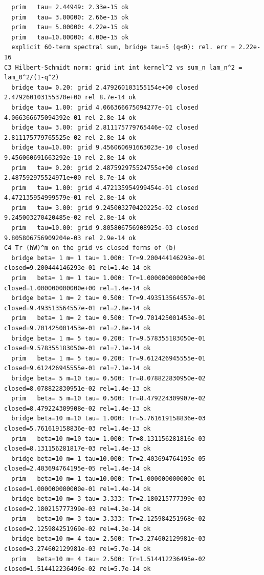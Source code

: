 \documentclass[11pt,a4paper]{article}
\begin{document}
\begin{lstlisting}
  prim   tau= 2.44949: 2.33e-15 ok
  prim   tau= 3.00000: 2.66e-15 ok
  prim   tau= 5.00000: 4.22e-15 ok
  prim   tau=10.00000: 4.00e-15 ok
  explicit 60-term spectral sum, bridge tau=5 (q<0): rel. err = 2.22e-16
C3 Hilbert-Schmidt norm: grid int int kernel^2 vs sum_n lam_n^2 = lam_0^2/(1-q^2)
  bridge tau= 0.20: grid 2.479260103155154e+00 closed 2.479260103155370e+00 rel 8.7e-14 ok
  bridge tau= 1.00: grid 4.066366675094277e-01 closed 4.066366675094392e-01 rel 2.8e-14 ok
  bridge tau= 3.00: grid 2.811175779765446e-02 closed 2.811175779765525e-02 rel 2.8e-14 ok
  bridge tau=10.00: grid 9.456060691663023e-10 closed 9.456060691663292e-10 rel 2.8e-14 ok
  prim   tau= 0.20: grid 2.487592975524755e+00 closed 2.487592975524971e+00 rel 8.7e-14 ok
  prim   tau= 1.00: grid 4.472135954999454e-01 closed 4.472135954999579e-01 rel 2.8e-14 ok
  prim   tau= 3.00: grid 9.245003270420225e-02 closed 9.245003270420485e-02 rel 2.8e-14 ok
  prim   tau=10.00: grid 9.805806756908925e-03 closed 9.805806756909204e-03 rel 2.9e-14 ok
C4 Tr (hW)^m on the grid vs closed forms of (b)
  bridge beta= 1 m= 1 tau= 1.000: Tr=9.200444146293e-01 closed=9.200444146293e-01 rel=1.4e-14 ok
  prim   beta= 1 m= 1 tau= 1.000: Tr=1.000000000000e+00 closed=1.000000000000e+00 rel=1.4e-14 ok
  bridge beta= 1 m= 2 tau= 0.500: Tr=9.493513564557e-01 closed=9.493513564557e-01 rel=2.8e-14 ok
  prim   beta= 1 m= 2 tau= 0.500: Tr=9.701425001453e-01 closed=9.701425001453e-01 rel=2.8e-14 ok
  bridge beta= 1 m= 5 tau= 0.200: Tr=9.578355183050e-01 closed=9.578355183050e-01 rel=7.1e-14 ok
  prim   beta= 1 m= 5 tau= 0.200: Tr=9.612426945555e-01 closed=9.612426945555e-01 rel=7.1e-14 ok
  bridge beta= 5 m=10 tau= 0.500: Tr=8.078822830950e-02 closed=8.078822830951e-02 rel=1.4e-13 ok
  prim   beta= 5 m=10 tau= 0.500: Tr=8.479224309907e-02 closed=8.479224309908e-02 rel=1.4e-13 ok
  bridge beta=10 m=10 tau= 1.000: Tr=5.761619158836e-03 closed=5.761619158836e-03 rel=1.4e-13 ok
  prim   beta=10 m=10 tau= 1.000: Tr=8.131156281816e-03 closed=8.131156281817e-03 rel=1.4e-13 ok
  bridge beta=10 m= 1 tau=10.000: Tr=2.403694764195e-05 closed=2.403694764195e-05 rel=1.4e-14 ok
  prim   beta=10 m= 1 tau=10.000: Tr=1.000000000000e-01 closed=1.000000000000e-01 rel=1.4e-14 ok
  bridge beta=10 m= 3 tau= 3.333: Tr=2.180215777399e-03 closed=2.180215777399e-03 rel=4.3e-14 ok
  prim   beta=10 m= 3 tau= 3.333: Tr=2.125984251968e-02 closed=2.125984251969e-02 rel=4.3e-14 ok
  bridge beta=10 m= 4 tau= 2.500: Tr=3.274602129981e-03 closed=3.274602129981e-03 rel=5.7e-14 ok
  prim   beta=10 m= 4 tau= 2.500: Tr=1.514412236495e-02 closed=1.514412236496e-02 rel=5.7e-14 ok

\end{lstlisting}
\end{document}
